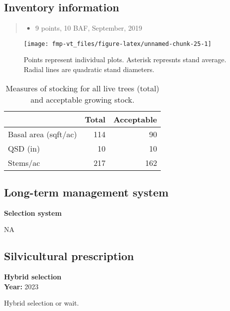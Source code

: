 \documentclass[]{tufte-handout}
\providecommand{\tightlist}{%
  \setlength{\itemsep}{0pt}\setlength{\parskip}{0pt}}
\begin{document}
\subsection{Inventory information}\label{inventory-information-4}

\begin{quote}
\begin{itemize}
\tightlist
\item
  9 points, 10 BAF, September, 2019
\end{itemize}
\end{quote}

\begin{figure}
\texttt{[image: fmp-vt\_files/figure-latex/unnamed-chunk-25-1]} \caption[Points represent individual plots]{Points represent individual plots. Asterisk represnts stand average. Radial lines are quadratic stand diameters.}\label{fig:unnamed-chunk-25}
\end{figure}

\begin{table}

\caption{\label{tab:unnamed-chunk-26}Measures of stocking for all live trees (total) and acceptable growing stock.}
\centering
\begin{tabular}[t]{lrr}
\toprule
  & Total & Acceptable\\
\midrule
Basal area (sqft/ac) & 114 & 90\\
QSD (in) & 10 & 10\\
Stems/ac & 217 & 162\\
\bottomrule
\end{tabular}
\end{table}

\subsection{Long-term management
system}\label{long-term-management-system-4}

\textbf{Selection system}

NA

\subsection{Silvicultural
prescription}\label{silvicultural-prescription-4}

\textbf{Hybrid selection}\\
\noindent \textbf{Year:} 2023

Hybrid selection or wait.
\end{document}
